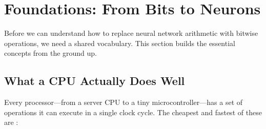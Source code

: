 \section{Foundations: From Bits to Neurons}
\label{sec:foundations}

Before we can understand how to replace neural network arithmetic with
bitwise operations, we need a shared vocabulary. This section builds the
essential concepts from the ground up.

\subsection{What a CPU Actually Does Well}
\label{sec:cpu-ops}

Every processor---from a server CPU to a tiny microcontroller---has
a set of operations it can execute in a single clock cycle. The
cheapest and fastest of these are :

